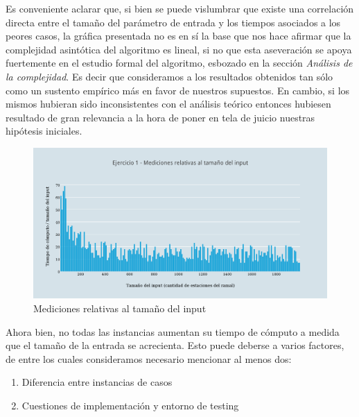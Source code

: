 Es conveniente aclarar que, si bien se puede vislumbrar que existe una correlación directa entre el tamaño del parámetro de entrada y los tiempos asociados a los peores casos, la gráfica presentada no es en sí la base que nos hace afirmar que la complejidad asintótica del algoritmo es lineal, si no que esta aseveración se apoya fuertemente en el estudio formal del algoritmo, esbozado en la sección \textit{An\'alisis de la complejidad}. Es decir que consideramos a los resultados obtenidos tan sólo como un sustento empírico más en favor de nuestros supuestos. En cambio, si los mismos hubieran sido inconsistentes con el análisis teórico entonces hubiesen resultado de gran relevancia a la hora de poner en tela de  juicio nuestras hipótesis iniciales. \\

 
  \begin{figure}[h!]
   \begin{center}
 	\includegraphics[scale=0.8]{imagenes/ej1/relativas.png}
	\caption{Mediciones relativas al tamaño del input}
	\label{estacionesRel}
   \end{center}
 \end{figure}

 Ahora bien, no todas las instancias aumentan su tiempo de cómputo a medida que el tamaño de la entrada se acrecienta. Esto puede deberse a varios factores, de entre los cuales consideramos necesario mencionar al menos dos:
 \begin{enumerate}[1.]
 \item {Diferencia entre instancias de casos}
 \item{Cuestiones de implementación y entorno de testing}
\end{enumerate}

